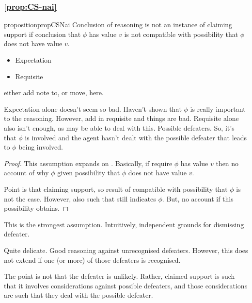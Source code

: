 \subsubsection{\autoref{prop:CS-nai}}
\label{sec:claim-supp-nai}

\begin{note}
  \begin{restatable}{proposition}{propCSNai}\label{prop:CS-nai}
    Conclusion of reasoning is not an instance of claiming support if conclusion that \(\phi\) has value \(v\) is not compatible with possibility that \(\phi\) does not have value \(v\).

    \begin{itemize}
    \item Expectation
    \item Requisite
    \end{itemize}
  \end{restatable}

  {
    \color{red} either add note to, or move, \citeauthor{Sgaravatti:2013wu} here.
  }

  Expectation alone doesn't seem so bad.
  Haven't shown that \(\phi\) is really important to the reasoning.
  However, add in requisite and things are bad.
  Requisite alone also isn't enough, as may be able to deal with this.
  Possible defeaters.
  So, it's that \(\phi\) is involved and the agent hasn't dealt with the possible defeater that leads to \(\phi\) being involved.

  \begin{proof}
    This assumption expands on \eiS{}.
    Basically, if require \(\phi\) has value \(v\) then no account of why \(\phi\) given possibility that \(\phi\) does not have value \(v\).

    Point is that claiming support, so result of compatible with possibility that \(\phi\) is not the case.
    However, also such that still indicates \(\phi\).
    But, no account if this possibility obtains.
  \end{proof}

  This is the strongest assumption.
  Intuitively, independent grounds for dismissing defeater.

  Quite delicate.
  Good reasoning against unrecognised defeaters.
  However, this does not extend if one (or more) of those defeaters is recognised.

  The point is not that the defeater is unlikely.
  Rather, claimed support is such that it involves considerations against possible defeaters, and those considerations are such that they deal with the possible defeater.
\end{note}

